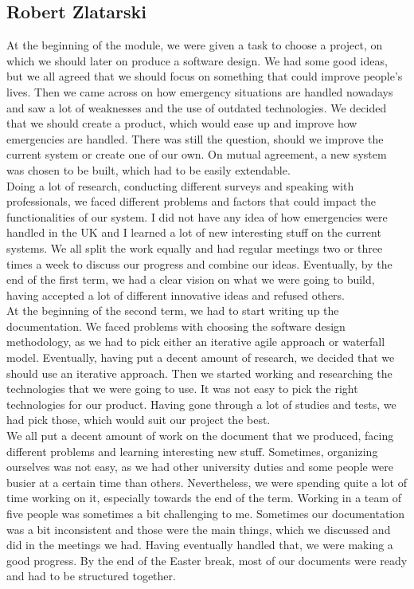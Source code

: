 \documentclass[]{article}
\begin{document}
    \subsection{Robert Zlatarski}
    At the beginning of the module, we were given a task to choose a project, on which we should later on produce a software design. We had some good ideas, but we all agreed that we should focus on something that could improve people’s lives. Then we came across on how emergency situations are handled nowadays and saw a lot of weaknesses and the use of outdated technologies. We decided that we should create a product, which would ease up and improve how emergencies are handled. There was still the question, should we improve the current system or create one of our own. On mutual agreement, a new system was chosen to be built, which had to be easily extendable.\\

Doing a lot of research, conducting different surveys and speaking with professionals, we faced different problems and factors that could impact the functionalities of our system. I did not have any idea of how emergencies were handled in the UK and I learned a lot of new interesting stuff on the current systems. We all split the work equally and had regular meetings two or three times a week to discuss our progress and combine our ideas. Eventually, by the end of the first term, we had a clear vision on what we were going to build, having accepted a lot of different innovative ideas and refused others.\\

At the beginning of the second term, we had to start writing up the documentation. We faced problems with choosing the software design methodology, as we had to pick either an iterative agile approach or waterfall model. Eventually, having put a decent amount of research, we decided that we should use an iterative approach. Then we started working and researching the technologies that we were going to use. It was not easy to pick the right technologies for our product. Having gone through a lot of studies and tests, we had pick those, which would suit our project the best.\\

We all put a decent amount of work on the document that we produced, facing different problems and learning interesting new stuff. Sometimes, organizing ourselves was not easy, as we had other university duties and some people were busier at a certain time than others. Nevertheless, we were spending quite a lot of time working on it, especially towards the end of the term. Working in a team of five people was sometimes a bit challenging to me. Sometimes our documentation was a bit inconsistent and those were the main things, which we discussed and did in the meetings we had. Having eventually handled that, we were making a good progress. By the end of the Easter break, most of our documents were ready and had to be structured together.\\
\end{document}
